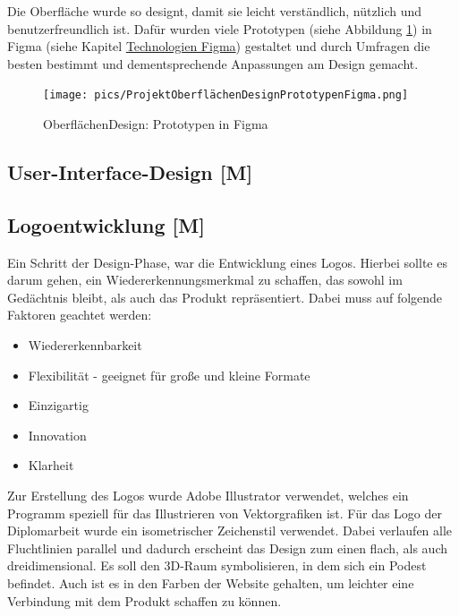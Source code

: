 Die Oberfläche wurde so designt, damit sie leicht verständlich, nützlich und benutzerfreundlich ist. Dafür wurden viele Prototypen (siehe Abbildung \ref{fig:impl:design:prototypesfigma}) in Figma (siehe Kapitel \hyperref[ch::technologies::figma]{Technologien Figma}) gestaltet und durch Umfragen die besten bestimmt und dementsprechende Anpassungen am Design gemacht.

\begin{figure}
    \centering
    \texttt{[image: pics/ProjektOberflächenDesignPrototypenFigma.png]}
    \caption{OberflächenDesign: Prototypen in Figma}
    \label{fig:impl:design:prototypesfigma}
\end{figure}

\subsection{User-Interface-Design [M]}


\subsection{Logoentwicklung [M]}
Ein Schritt der Design-Phase, war die Entwicklung eines Logos. Hierbei sollte es darum gehen, ein Wiedererkennungsmerkmal zu schaffen, das sowohl im Gedächtnis bleibt, als auch das Produkt repräsentiert. Dabei muss auf folgende Faktoren geachtet werden:

\begin{itemize}
    \item Wiedererkennbarkeit
    \item Flexibilität - geeignet für große und kleine Formate
    \item Einzigartig
    \item Innovation
    \item Klarheit
\end{itemize}
\cite{LogoKriterien}

Zur Erstellung des Logos wurde Adobe Illustrator verwendet, welches ein Programm speziell für das Illustrieren von Vektorgrafiken ist. Für das Logo der Diplomarbeit wurde ein isometrischer Zeichenstil verwendet. Dabei verlaufen alle Fluchtlinien parallel und dadurch erscheint das Design zum einen flach, als auch dreidimensional. Es soll den 3D-Raum symbolisieren, in dem sich ein Podest befindet. Auch ist es in den Farben der Website gehalten, um leichter eine Verbindung mit dem Produkt schaffen zu können.
\cite{IsometricStyle}
\cite{Logo}

